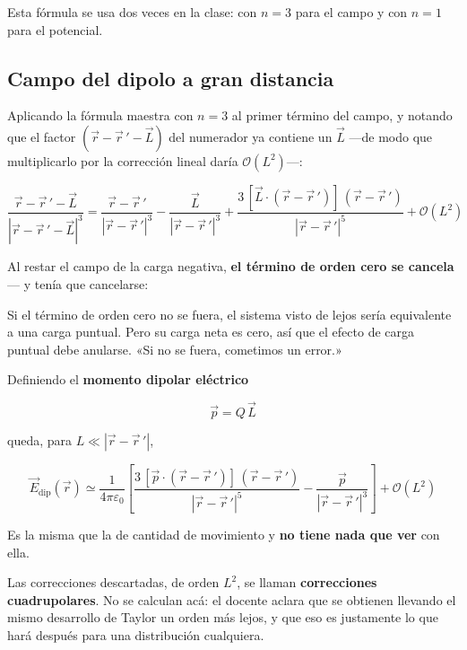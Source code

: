 \documentclass[12pt,a4paper]{article}
\begin{document}
Esta fórmula se usa dos veces en la clase: con $n=3$ para el campo y con $n=1$
para el potencial.

\subsection{Campo del dipolo a gran distancia}

Aplicando la fórmula maestra con $n = 3$ al primer término del campo, y notando
que el factor $(\vec r - \vec r\,' - \vec L)$ del numerador ya contiene un
$\vec L$ ---de modo que multiplicarlo por la corrección lineal daría
$\mathcal{O}(L^2)$---:

\[
\frac{\vec r - \vec r\,' - \vec L}{|\vec r - \vec r\,' - \vec L|^3}
= \frac{\vec r - \vec r\,'}{|\vec r - \vec r\,'|^3}
- \frac{\vec L}{|\vec r - \vec r\,'|^3}
+ \frac{3\,[\vec L\cdot(\vec r - \vec r\,')]\,(\vec r - \vec r\,')}{|\vec r - \vec r\,'|^5}
+ \mathcal{O}(L^2)
\]

Al restar el campo de la carga negativa, \textbf{el término de orden cero se
cancela} --- y tenía que cancelarse:

\begin{notebox}
Si el término de orden cero no se fuera, el sistema visto de lejos sería
equivalente a una carga puntual. Pero su carga neta es cero, así que el efecto de
carga puntual debe anularse. «Si no se fuera, cometimos un error.»
\end{notebox}

Definiendo el \textbf{momento dipolar eléctrico}

\[
\boxed{\;\vec p = Q\,\vec L\;}
\]

queda, para $L \ll |\vec r - \vec r\,'|$,

\[
\boxed{\;\vec E_{\text{dip}}(\vec r) \simeq \frac{1}{4\pi\varepsilon_0}\left[
  \frac{3\,[\vec p\cdot(\vec r - \vec r\,')]\,(\vec r - \vec r\,')}{|\vec r - \vec r\,'|^{5}}
  - \frac{\vec p}{|\vec r - \vec r\,'|^{3}}\right] + \mathcal{O}(L^2)\;}
\]

\begin{warnbox}[La letra $p$]
Es la misma que la de cantidad de movimiento y \textbf{no tiene nada que ver} con
ella.
\end{warnbox}

Las correcciones descartadas, de orden $L^2$, se llaman \textbf{correcciones
cuadrupolares}. No se calculan acá: el docente aclara que se obtienen llevando el
mismo desarrollo de Taylor un orden más lejos, y que eso es justamente lo que
hará después para una distribución cualquiera.
\end{document}
